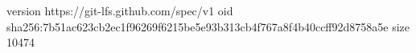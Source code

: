 version https://git-lfs.github.com/spec/v1
oid sha256:7b51ac623cb2ec1f96269f6215be5e93b313cb4f767a8f4b40ccff92d8758a5e
size 10474
